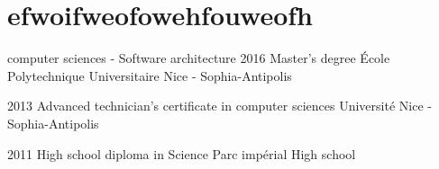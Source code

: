 \section{efwoifweofowehfouweofh}

\begin{yearlist}

\item[computer sciences - Software architecture]{2016}
     {Master's degree}
     {\'Ecole Polytechnique Universitaire Nice - Sophia-Antipolis}

\item{2013}
     {Advanced technician's certificate in computer sciences}
     {Universit\'e Nice - Sophia-Antipolis}

\item{2011}
     {High school diploma in Science}
     {Parc imp\'erial High school}

\end{yearlist}